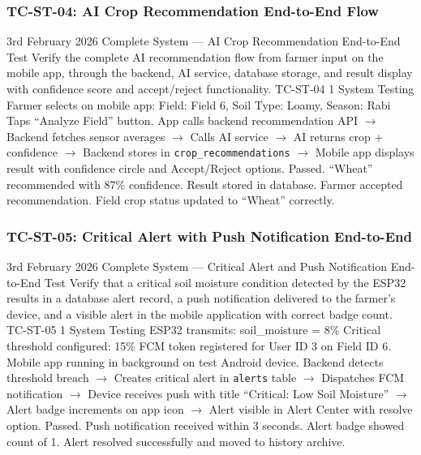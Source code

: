 \subsubsection{TC-ST-04: AI Crop Recommendation End-to-End Flow}

\testcase%
{3rd February 2026}%
{Complete System --- AI Crop Recommendation End-to-End
Test}%
{Verify the complete AI recommendation flow from farmer
input on the mobile app, through the backend, AI service,
database storage, and result display with confidence score
and accept/reject functionality.}%
{TC-ST-04}%
{1}%
{System Testing}%
{Farmer selects on mobile app: \newline
Field: Field 6, Soil Type: Loamy, Season: Rabi \newline
Taps ``Analyze Field'' button.}%
{App calls backend recommendation API $\rightarrow$ Backend
fetches sensor averages $\rightarrow$ Calls AI service
$\rightarrow$ AI returns crop + confidence $\rightarrow$
Backend stores in \texttt{crop\_recommendations}
$\rightarrow$ Mobile app displays result with confidence
circle and Accept/Reject options.}%
{Passed. ``Wheat'' recommended with 87\% confidence.
Result stored in database. Farmer accepted recommendation.
Field crop status updated to ``Wheat'' correctly.}

\subsubsection{TC-ST-05: Critical Alert with Push Notification End-to-End}

\testcase%
{3rd February 2026}%
{Complete System --- Critical Alert and Push Notification
End-to-End Test}%
{Verify that a critical soil moisture condition detected
by the ESP32 results in a database alert record, a push
notification delivered to the farmer's device, and a
visible alert in the mobile application with correct badge
count.}%
{TC-ST-05}%
{1}%
{System Testing}%
{ESP32 transmits: soil\_moisture = 8\% \newline
Critical threshold configured: 15\% \newline
FCM token registered for User ID 3 on Field ID 6. \newline
Mobile app running in background on test Android device.}%
{Backend detects threshold breach $\rightarrow$ Creates
critical alert in \texttt{alerts} table $\rightarrow$
Dispatches FCM notification $\rightarrow$ Device receives
push with title ``Critical: Low Soil Moisture''
$\rightarrow$ Alert badge increments on app icon
$\rightarrow$ Alert visible in Alert Center with resolve
option.}%
{Passed. Push notification received within 3 seconds. Alert
badge showed count of 1. Alert resolved successfully and
moved to history archive.}

